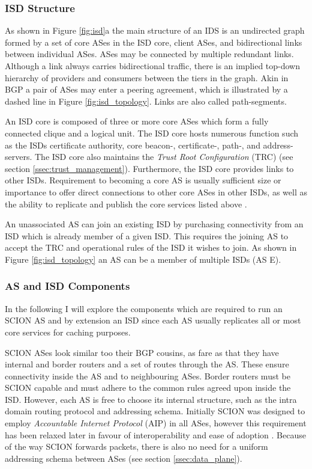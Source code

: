 \documentclass[../eva1_scion.tex]{subfiles}
\begin{document}
    \subsubsection{ISD Structure} \label{sssec:isd_structure}
    As shown in Figure \ref{fig:isd}a the main structure of an IDS is an undirected graph formed by a set of core ASes in the ISD core, client ASes, and bidirectional links between individual ASes. ASes may be connected by multiple redundant links. Although a link always carries bidirectional traffic, there is an implied top-down hierarchy of providers and consumers between the tiers in the graph. Akin in BGP a pair of ASes may enter a peering agreement, which is illustrated by a dashed line in Figure \ref{fig:isd_topology}. Links are also called path-segments.

    An ISD core is composed of three or more core ASes which form a fully connected clique and a logical unit. The ISD core hosts numerous function such as the ISDs certificate authority, core beacon-, certificate-, path-, and address-servers. The ISD core also maintains the \textit{Trust Root Configuration} (TRC) (see section \ref{ssec:trust_management}). Furthermore, the ISD core  provides links to other ISDs.  Requirement to becoming a core AS is usually sufficient size or importance to offer direct connections to other core ASes in other ISDs, as well as the ability to replicate and publish the core services listed above \cite{scion_2011}.

    An unassociated AS can join an existing ISD by purchasing connectivity from an ISD which is already member of a given ISD. This requires the joining AS to accept the TRC and operational rules of the ISD it wishes to join. As shown in Figure \ref{fig:isd_topology} an AS can be a member of multiple ISDs (AS E).

    \subsubsection{AS and ISD Components} \label{sssec:as_componants}

    In the following I will explore the components which are required to run an SCION AS and by extension an ISD since each AS usually replicates all or most core services for caching purposes.

    SCION ASes look similar too their BGP cousins, as fare as that they have internal and border routers and a set of routes through the AS. These ensure connectivity inside the AS and to neighbouring ASes. Border routers must be SCION capable and must adhere to the common rules agreed upon inside the ISD. However, each AS is free to choose its internal structure, such as the intra domain routing protocol and addressing schema. Initially SCION was designed to employ \textit{Accountable Internet Protocol} (AIP) \cite{scion_2011, aip_2008} in all ASes, however this requirement has been relaxed later in favour of interoperability and ease of adoption \cite{scion_2015}. Because of the way SCION forwards packets, there is also no need for a uniform addressing schema between ASes (see section \ref{ssec:data_plane}).
\end{document}
